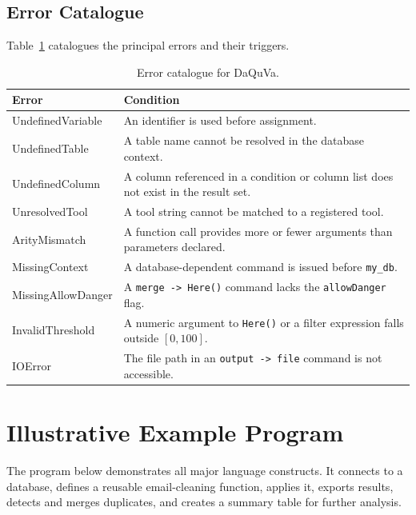 \begin{itemize}[label=-, noitemsep]
\begin{itemize}[label=-, noitemsep]
\begin{itemize}[label=-, noitemsep]
\begin{itemize}[label=-, noitemsep]
\subsection{Error Catalogue}

Table~\ref{tab:errors} catalogues the principal errors and their triggers.

\begin{table}[H]
\centering
\caption{Error catalogue for DaQuVa.}
\label{tab:errors}
\renewcommand{\arraystretch}{1.35}
\begin{tabular}{|p{4cm}|p{10cm}|}
\hline
\normalfont\textbf{Error} & \textbf{Condition} \\
\hline
UndefinedVariable & An identifier is used before assignment. \\
\hline
UndefinedTable    & A table name cannot be resolved in the database context. \\
\hline
UndefinedColumn   & A column referenced in a condition or column list does
                    not exist in the result set. \\
\hline
UnresolvedTool    & A tool string cannot be matched to a registered tool. \\
\hline
ArityMismatch     & A function call provides more or fewer arguments than
                    parameters declared. \\
\hline
MissingContext    & A database-dependent command is issued before
                    \texttt{my\_db}. \\
\hline
MissingAllowDanger & A \texttt{merge -> Here()} command lacks the
                    \texttt{allowDanger} flag. \\
\hline
InvalidThreshold  & A numeric argument to \texttt{Here()} or a filter
                    expression falls outside $[0, 100]$. \\
\hline
IOError           & The file path in an \texttt{output -> file} command
                    is not accessible. \\
\hline
\end{tabular}
\end{table}

\section{Illustrative Example Program}
\label{sec:example}

The program below demonstrates all major language constructs. It connects to a
database, defines a reusable email-cleaning function, applies it, exports
results, detects and merges duplicates, and creates a summary table for further
analysis.


\end{itemize}
\end{itemize}
\end{itemize}
\end{itemize}
